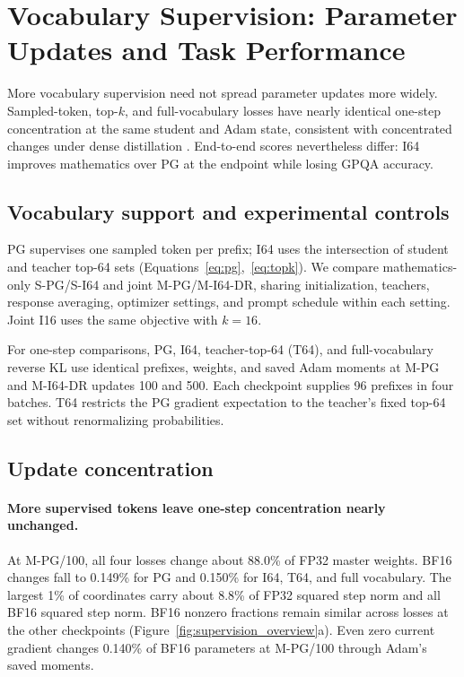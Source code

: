 \section{Vocabulary Supervision: Parameter Updates and Task Performance}
\label{sec:density}

More vocabulary supervision need not spread parameter updates more widely. Sampled-token, top-$k$, and full-vocabulary losses have nearly identical one-step concentration at the same student and Adam state, consistent with concentrated changes under dense distillation \citep{yu2026denseupdates}. End-to-end scores nevertheless differ: I64 improves mathematics over PG at the endpoint while losing GPQA accuracy.

\subsection{Vocabulary support and experimental controls}

PG supervises one sampled token per prefix; I64 uses the intersection of student and teacher top-64 sets (Equations~\ref{eq:pg},~\ref{eq:topk}). We compare mathematics-only S-PG/S-I64 and joint M-PG/M-I64-DR, sharing initialization, teachers, response averaging, optimizer settings, and prompt schedule within each setting. Joint I16 uses the same objective with $k=16$.

For one-step comparisons, PG, I64, teacher-top-64 (T64), and full-vocabulary reverse KL use identical prefixes, weights, and saved Adam moments at M-PG and M-I64-DR updates 100 and 500. Each checkpoint supplies 96 prefixes in four batches. T64 restricts the PG gradient expectation to the teacher's fixed top-64 set without renormalizing probabilities.

\subsection{Update concentration}

\paragraph{More supervised tokens leave one-step concentration nearly unchanged.}
At M-PG/100, all four losses change about 88.0\% of FP32 master weights. BF16 changes fall to 0.149\% for PG and 0.150\% for I64, T64, and full vocabulary. The largest 1\% of coordinates carry about 8.8\% of FP32 squared step norm and all BF16 squared step norm. BF16 nonzero fractions remain similar across losses at the other checkpoints (Figure~\ref{fig:supervision_overview}a). Even zero current gradient changes 0.140\% of BF16 parameters at M-PG/100 through Adam's saved moments.


